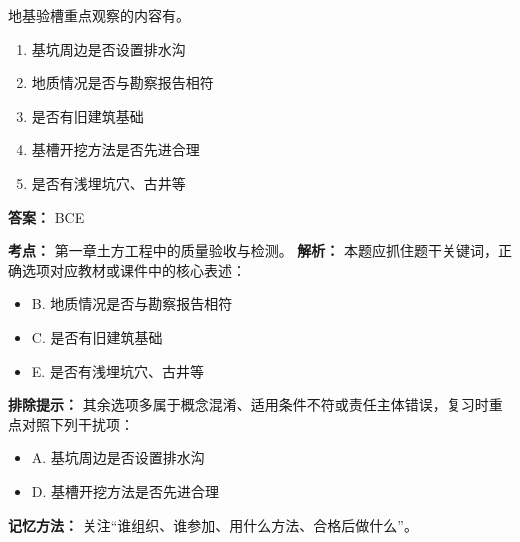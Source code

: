 \documentclass[UTF8,fontset=fandol,11pt]{ctexart}
\begin{document}
\begin{quizbox}[title={第 27 题}]
地基验槽重点观察的内容有。\\
\begin{enumerate}[label=\Alph*.]
\item 基坑周边是否设置排水沟
\item 地质情况是否与勘察报告相符
\item 是否有旧建筑基础
\item 基槽开挖方法是否先进合理
\item 是否有浅埋坑穴、古井等
\end{enumerate}
\textbf{答案：} BCE
\vspace{0.25em}
\begin{answerbox}[title={考点解析}]
\textbf{考点：} 第一章土方工程中的质量验收与检测。
\textbf{解析：} 本题应抓住题干关键词，正确选项对应教材或课件中的核心表述：
\begin{itemize}
\item B. 地质情况是否与勘察报告相符
\item C. 是否有旧建筑基础
\item E. 是否有浅埋坑穴、古井等
\end{itemize}
\textbf{排除提示：} 其余选项多属于概念混淆、适用条件不符或责任主体错误，复习时重点对照下列干扰项：
\begin{itemize}
\item A. 基坑周边是否设置排水沟
\item D. 基槽开挖方法是否先进合理
\end{itemize}
\textbf{记忆方法：} 关注“谁组织、谁参加、用什么方法、合格后做什么”。
\end{answerbox}
\end{quizbox}
\end{document}
